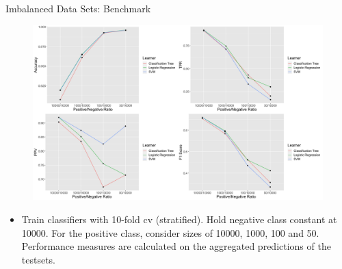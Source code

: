 \documentclass[11pt,compress,t,notes=noshow, xcolor=table]{beamer}
\begin{document}
\begin{vbframe}{Imbalanced Data Sets: Benchmark}
%
			\begin{figure}
				\centering
				\includegraphics[width=0.9\linewidth]{figure_man/benchmark_plots.png}
			\end{figure}
			
			\begin{itemize}
			\footnotesize
                \item Train classifiers with 10-fold cv (stratified). Hold negative class constant at 10000. For the positive class, consider sizes of 10000, 1000, 100 and 50. Performance measures are calculated on the aggregated predictions of the testsets.
			\end{itemize}

%
\end{vbframe}
\end{document}
